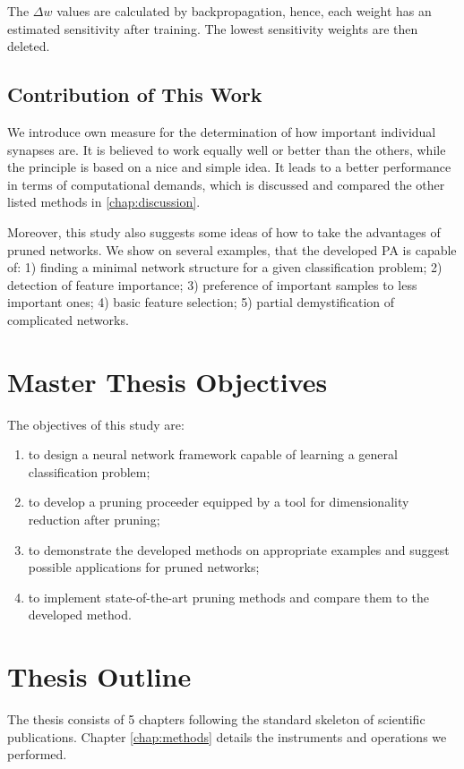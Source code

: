 The $ \Delta w $ values are calculated by backpropagation, hence, each weight has an estimated sensitivity after training. The lowest sensitivity weights are then deleted.

\subsection*{Contribution of This Work} \label{ssec:contribution_of_this_work}
We introduce own measure for the determination of how important individual synapses are. It is believed to work equally well or better than the others, while the principle is based on a nice and simple idea. It leads to a better performance in terms of computational demands, which is discussed and compared the other listed methods in \cref{chap:discussion}.

Moreover, this study also suggests some ideas of how to take the advantages of pruned networks. We show on several examples, that the developed PA is capable of: 1) finding a minimal network structure for a given classification problem; 2) detection of feature importance; 3) preference of important samples to less important ones; 4) basic feature selection; 5) partial demystification of complicated networks.

\section{Master Thesis Objectives} \label{sec:thesis_objectives}
The objectives of this study are:

\begin{enumerate}
\item to design a neural network framework capable of learning a general classification problem;
\item to develop a pruning proceeder equipped by a tool for dimensionality reduction after pruning;
\item to demonstrate the developed methods on appropriate examples and suggest possible applications for pruned networks;
\item to implement state-of-the-art pruning methods and compare them to the developed method.
\end{enumerate}

\section{Thesis Outline} \label{sec:thesis_outline}
The thesis consists of 5 chapters following the standard skeleton of scientific publications. Chapter \ref{chap:methods} details the instruments and operations we performed. 

